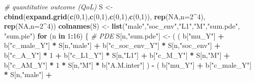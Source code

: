 \documentclass[
]{book}
\newenvironment{Shaded}{\begin{snugshade}}{\end{snugshade}}
\newcommand{\AttributeTok}[1]{\textcolor[rgb]{0.13,0.29,0.53}{#1}}
\newcommand{\CommentTok}[1]{\textcolor[rgb]{0.56,0.35,0.01}{\textit{#1}}}
\newcommand{\ConstantTok}[1]{\textcolor[rgb]{0.56,0.35,0.01}{#1}}
\newcommand{\ControlFlowTok}[1]{\textcolor[rgb]{0.13,0.29,0.53}{\textbf{#1}}}
\newcommand{\DecValTok}[1]{\textcolor[rgb]{0.00,0.00,0.81}{#1}}
\newcommand{\FunctionTok}[1]{\textcolor[rgb]{0.13,0.29,0.53}{\textbf{#1}}}
\newcommand{\NormalTok}[1]{#1}
\newcommand{\OtherTok}[1]{\textcolor[rgb]{0.56,0.35,0.01}{#1}}
\newcommand{\SpecialCharTok}[1]{\textcolor[rgb]{0.81,0.36,0.00}{\textbf{#1}}}
\newcommand{\StringTok}[1]{\textcolor[rgb]{0.31,0.60,0.02}{#1}}
\begin{document}
\begin{Shaded}
\begin{Highlighting}[]
  
  \CommentTok{\# quantitative outcome (QoL)}
\NormalTok{  S }\OtherTok{\textless{}{-}} \FunctionTok{cbind}\NormalTok{(}\FunctionTok{expand.grid}\NormalTok{(}\FunctionTok{c}\NormalTok{(}\DecValTok{0}\NormalTok{,}\DecValTok{1}\NormalTok{),}\FunctionTok{c}\NormalTok{(}\DecValTok{0}\NormalTok{,}\DecValTok{1}\NormalTok{),}\FunctionTok{c}\NormalTok{(}\DecValTok{0}\NormalTok{,}\DecValTok{1}\NormalTok{),}\FunctionTok{c}\NormalTok{(}\DecValTok{0}\NormalTok{,}\DecValTok{1}\NormalTok{)), }\FunctionTok{rep}\NormalTok{(}\ConstantTok{NA}\NormalTok{,}\AttributeTok{n=}\DecValTok{2}\SpecialCharTok{\^{}}\DecValTok{4}\NormalTok{), }\FunctionTok{rep}\NormalTok{(}\ConstantTok{NA}\NormalTok{,}\AttributeTok{n=}\DecValTok{2}\SpecialCharTok{\^{}}\DecValTok{4}\NormalTok{))}
  \FunctionTok{colnames}\NormalTok{(S) }\OtherTok{\textless{}{-}} \FunctionTok{list}\NormalTok{(}\StringTok{"male"}\NormalTok{,}\StringTok{"soc\_env"}\NormalTok{,}\StringTok{"L1"}\NormalTok{,}\StringTok{"M"}\NormalTok{,}\StringTok{"sum.pde"}\NormalTok{, }\StringTok{"sum.pie"}\NormalTok{)}
  \ControlFlowTok{for}\NormalTok{ (n }\ControlFlowTok{in} \DecValTok{1}\SpecialCharTok{:}\DecValTok{16}\NormalTok{) \{}
    \CommentTok{\# PDE }
\NormalTok{    S[n,}\StringTok{"sum.pde"}\NormalTok{] }\OtherTok{\textless{}{-}}\NormalTok{ ( ( b[}\StringTok{"mu\_Y"}\NormalTok{] }\SpecialCharTok{+} 
\NormalTok{                            b[}\StringTok{"c\_male\_Y"}\NormalTok{] }\SpecialCharTok{*}\NormalTok{ S[n,}\StringTok{"male"}\NormalTok{] }\SpecialCharTok{+} 
\NormalTok{                            b[}\StringTok{"c\_soc\_env\_Y"}\NormalTok{] }\SpecialCharTok{*}\NormalTok{ S[n,}\StringTok{"soc\_env"}\NormalTok{] }\SpecialCharTok{+} 
\NormalTok{                            b[}\StringTok{"c\_A\_Y"}\NormalTok{] }\SpecialCharTok{*} \DecValTok{1} \SpecialCharTok{+} 
\NormalTok{                            b[}\StringTok{"c\_L1\_Y"}\NormalTok{] }\SpecialCharTok{*}\NormalTok{ S[n,}\StringTok{"L1"}\NormalTok{] }\SpecialCharTok{+}
\NormalTok{                            b[}\StringTok{"c\_M\_Y"}\NormalTok{] }\SpecialCharTok{*}\NormalTok{ S[n,}\StringTok{"M"}\NormalTok{] }\SpecialCharTok{+}
\NormalTok{                            b[}\StringTok{"c\_AM\_Y"}\NormalTok{] }\SpecialCharTok{*} \DecValTok{1} \SpecialCharTok{*}\NormalTok{ S[n,}\StringTok{"M"}\NormalTok{] }\SpecialCharTok{*}\NormalTok{ b[}\StringTok{"A.M.inter"}\NormalTok{] ) }\SpecialCharTok{{-}} 
\NormalTok{                          ( b[}\StringTok{"mu\_Y"}\NormalTok{] }\SpecialCharTok{+} 
\NormalTok{                              b[}\StringTok{"c\_male\_Y"}\NormalTok{] }\SpecialCharTok{*}\NormalTok{ S[n,}\StringTok{"male"}\NormalTok{] }\SpecialCharTok{+} 

\end{Highlighting}
\end{Shaded}
\end{document}
